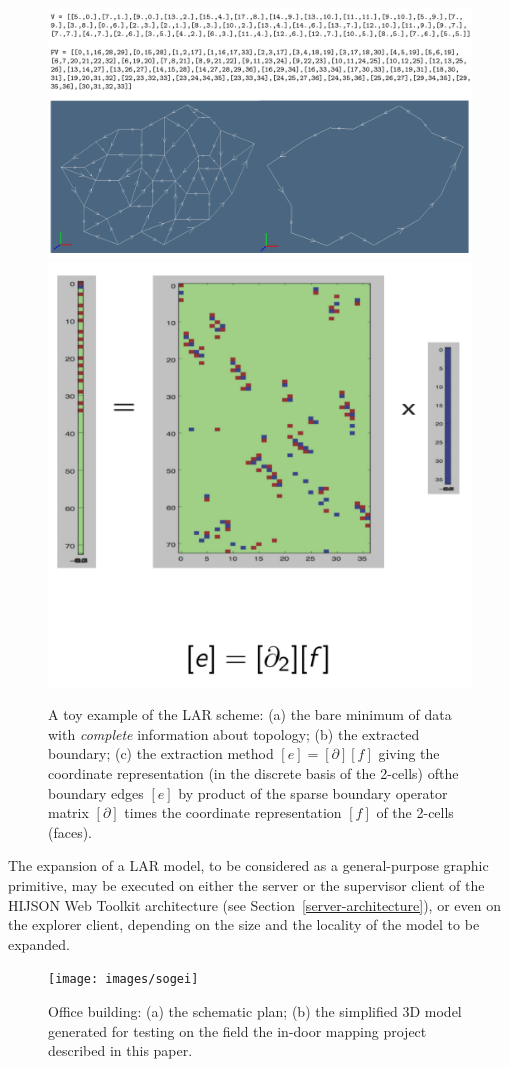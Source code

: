 \documentclass{sig-alternate}
\begin{document}
\begin{figure}[htbp] %
   \centering
   \includegraphics[width=0.5\linewidth]{images/minimum} 
   \hfill
   \includegraphics[width=0.4\linewidth]{images/boundary} 
   \caption{A toy example of the LAR scheme: (a) the bare minimum of data with \emph{complete} information about topology; (b) the extracted boundary; (c) the extraction method $[e] = [\partial][f]$ giving the coordinate representation (in the discrete basis of the 2-cells) ofthe boundary edges $[e]$ by product of the sparse boundary operator matrix $[\partial]$ times the coordinate representation $[f]$ of the 2-cells (faces).}
   \label{fig:minimum}
\end{figure}


The expansion of a LAR model, to be considered as a general-purpose graphic primitive, may be executed on either  the server or the supervisor client of the HIJSON Web Toolkit architecture (see Section~\ref{server-architecture}), or even on the explorer client, depending on the size and the locality of the model to be expanded.



\begin{figure}[htbp] %
   \centering
   \texttt{[image: images/sogei]} 
   \caption{Office building: (a) the schematic plan; (b) the simplified 3D model generated for testing on the field the in-door mapping project described in this paper.}
   \label{fig:sogei}
\end{figure}
\end{document}
